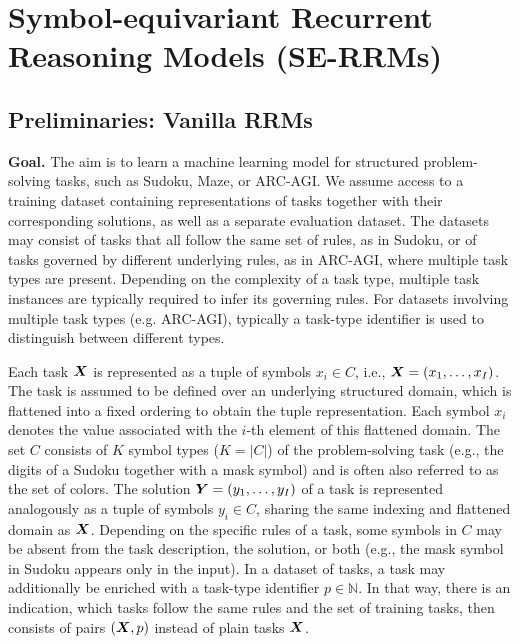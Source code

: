 \documentclass{article}
\theoremstyle{plain}
\theoremstyle{definition}
\theoremstyle{remark}
\renewcommand{\paragraph}[1]{\textbf{#1}\;}
\begin{document}
\section{Symbol-equivariant Recurrent Reasoning Models (SE-RRMs)}


\subsection{Preliminaries: Vanilla RRMs}

\paragraph{Goal.} The aim is to learn a machine learning model for structured problem-solving tasks, such as Sudoku, Maze, or ARC-AGI. We assume access to a training dataset containing representations of tasks together with their corresponding solutions, as well as a separate evaluation dataset. The datasets may consist of tasks that all follow the same set of rules, as in Sudoku, or of tasks governed by different underlying rules, as in ARC-AGI, where multiple task types are present. Depending on the complexity of a task type, multiple task instances are typically required to infer its governing rules. 
For datasets involving multiple task types (e.g. ARC-AGI), typically a task-type identifier is used to distinguish between different types. 

Each task $\bm{X}$ is represented as a tuple of symbols $x_i \in C$, i.e., $\bm{X} = (x_1, \ldots, x_I)$.
The task is assumed to be defined over an underlying structured domain, which is flattened into a fixed ordering to obtain the tuple representation. Each symbol $x_i$ denotes the value associated with the $i$-th element of this flattened domain. The set $C$ consists of $K$ symbol types ($K=|C|$) of the problem-solving task (e.g., the digits of a Sudoku together with a mask symbol) and is often also referred to as the set of colors. The solution $\bm{Y}= (y_1, \ldots, y_I)$ of a task is represented analogously as a tuple of symbols $y_i \in C$, sharing the same indexing and flattened domain as $\bm{X}$. Depending on the specific rules of a task, some symbols in $C$ may be absent from the task description, the solution, or both (e.g., the mask symbol in Sudoku appears only in the input). In a dataset of tasks, a task may additionally be enriched with a task-type identifier $p \in \mathbb{N}$. In that way, there is an indication, which tasks follow the same rules and the set of training tasks, then consists of pairs $(\bm{X}, p)$ instead of plain tasks $\bm{X}$.
\end{document}
